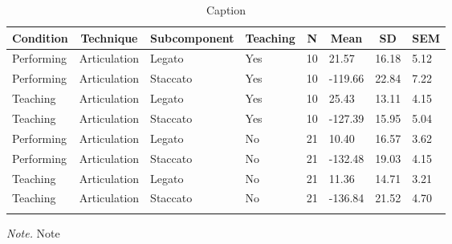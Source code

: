 \documentclass[
  man,floatsintext]{apa6}
\begin{document}
\begin{table}[tbp]

\begin{center}
\begin{threeparttable}

\caption{\label{tab:art-teaching-desc-1}Caption}

\begin{tabular}{llllllll}
\toprule
Condition & \multicolumn{1}{c}{Technique} & \multicolumn{1}{c}{Subcomponent} & \multicolumn{1}{c}{Teaching} & \multicolumn{1}{c}{N} & \multicolumn{1}{c}{Mean} & \multicolumn{1}{c}{SD} & \multicolumn{1}{c}{SEM}\\
\midrule
Performing & Articulation & Legato & Yes & 10 & 21.57 & 16.18 & 5.12\\
Performing & Articulation & Staccato & Yes & 10 & -119.66 & 22.84 & 7.22\\
Teaching & Articulation & Legato & Yes & 10 & 25.43 & 13.11 & 4.15\\
Teaching & Articulation & Staccato & Yes & 10 & -127.39 & 15.95 & 5.04\\
Performing & Articulation & Legato & No & 21 & 10.40 & 16.57 & 3.62\\
Performing & Articulation & Staccato & No & 21 & -132.48 & 19.03 & 4.15\\
Teaching & Articulation & Legato & No & 21 & 11.36 & 14.71 & 3.21\\
Teaching & Articulation & Staccato & No & 21 & -136.84 & 21.52 & 4.70\\
\bottomrule
\addlinespace
\end{tabular}

\begin{tablenotes}[para]
\normalsize{\textit{Note.} Note}
\end{tablenotes}

\end{threeparttable}
\end{center}

\end{table}
\end{document}
